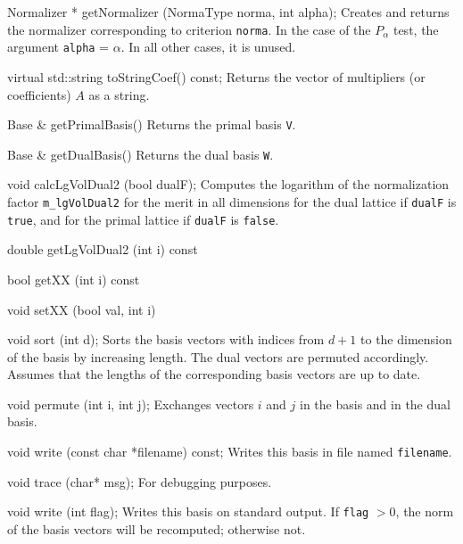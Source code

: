 {{   Normalizer * getNormalizer (NormaType norma, int alpha);
\endcode
\tabb
Creates and returns the normalizer corresponding to criterion \texttt{norma}.
In the case of the $P_\alpha$ test, the argument \texttt{alpha} = $\alpha$.
In all other cases, it is unused.
\endtabb
\code

   virtual std::string toStringCoef() const;
\endcode
\tabb
Returns the vector of multipliers (or coefficients) $A$ as a string.
\endtabb
\code

   Base & getPrimalBasis()  \endhide
\endcode
\tabb
Returns the primal basis \texttt{V}.
\endtabb
\code

   Base & getDualBasis()  \endhide
\endcode
\tabb
Returns the dual basis \texttt{W}.
\endtabb
\code

   void calcLgVolDual2 (bool dualF);
\endcode
\tabb Computes the logarithm of the normalization factor
 \texttt{m\_lgVolDual2} for the merit  in all dimensions %
 for the dual lattice if \texttt{dualF} is \texttt{true}, and for the primal
 lattice if \texttt{dualF} is \texttt{false}.
\endtabb
\code

   double getLgVolDual2 (int i) const  \endhide
\endcode
\tabb
\endtabb
\code

   bool getXX (int i) const  \endhide
\endcode
\tabb
\endtabb
\code

   void setXX (bool val, int i)  \endhide
\endcode
\tabb
\endtabb
\code

   void sort (int d);
\endcode
\tabb
Sorts the basis vectors with indices from $d+1$ to the dimension of the basis
   by increasing length. The dual vectors are permuted accordingly.
   Assumes that the lengths of the corresponding basis vectors
   are up to date.
\endtabb
\code

   void permute (int i, int j);
\endcode
\tabb
Exchanges vectors $i$ and $j$ in the basis and in the dual basis.
\endtabb
\code

   void write (const char *filename) const;
\endcode
\tabb
Writes this basis in file named \texttt{filename}.
\endtabb
\code

   void trace (char* msg);
\endcode
\tabb
For debugging purposes.
\endtabb
\code

   void write (int flag);
\endcode
\tabb
Writes this basis on standard output. If \texttt{flag} $ > 0$, the norm of
the basis vectors will be recomputed; otherwise not.
\endtabb
\code

}}
